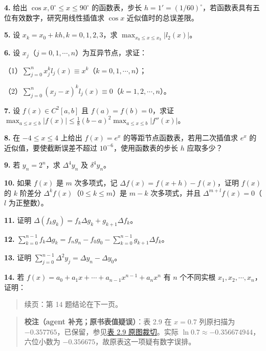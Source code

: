 \documentclass[
  10pt,
  fontset=fandol]{ctexart}
\begin{document}
\textbf{4.} 给出 \(\cos x,0^\circ\leqslant x\leqslant90^\circ\) 的函数表，步长 \(h=1'=(1/60)^\circ\)，若函数表具有五位有效数字，研究用线性插值求 \(\cos x\) 近似值时的总误差限。

\textbf{5.} 设 \(x_k=x_0+kh,k=0,1,2,3\)，求 \(\max_{x_0\leqslant x\leqslant x_3}|l_2(x)|\)。

\textbf{6.} 设 \(x_j\)（\(j=0,1,\cdots,n\)）为互异节点，求证：

（1）\(\displaystyle\sum_{j=0}^n x_j^kl_j(x)\equiv x^k\)（\(k=0,1,\cdots,n\)）；

（2）\(\displaystyle\sum_{j=0}^n(x_j-x)^kl_j(x)\equiv0\)（\(k=1,2,\cdots,n\)）。

\textbf{7.} 设 \(f(x)\in C^2[a,b]\) 且 \(f(a)=f(b)=0\)，求证 \(\displaystyle\max_{a\leqslant x\leqslant b}|f(x)|\leqslant\frac18(b-a)^2\max_{a\leqslant x\leqslant b}|f''(x)|\)。

\textbf{8.} 在 \(-4\leqslant x\leqslant4\) 上给出 \(f(x)=e^x\) 的等距节点函数表，若用二次插值求 \(e^x\) 的近似值，要使截断误差不超过 \(10^{-6}\)，使用函数表的步长 \(h\) 应取多少？

\textbf{9.} 若 \(y_n=2^n\)，求 \(\Delta^4y_n\) 及 \(\delta^4y_n\)。

\textbf{10.} 如果 \(f(x)\) 是 \(m\) 次多项式，记 \(\Delta f(x)=f(x+h)-f(x)\)，证明 \(f(x)\) 的 \(k\) 阶差分 \(\Delta^kf(x)\)（\(0\leqslant k\leqslant m\)）是 \(m-k\) 次多项式，并且 \(\Delta^{m+l}f(x)=0\)（\(l\) 为正整数）。

\textbf{11.} 证明 \(\Delta(f_kg_k)=f_k\Delta g_k+g_{k+1}\Delta f_k\)。

\textbf{12.} \(\displaystyle\sum_{k=0}^{n-1}f_k\Delta g_k=f_ng_n-f_0g_0-\sum_{k=0}^{n-1}g_{k+1}\Delta f_k\)。

\textbf{13.} 证明 \(\displaystyle\sum_{j=0}^{n-1}\Delta^2y_j=\Delta y_n-\Delta y_0\)。

\textbf{14.} 若 \(f(x)=a_0+a_1x+\cdots+a_{n-1}x^{n-1}+a_nx^n\) 有 \(n\) 个不同实根 \(x_1,x_2,\cdots,x_n\)，证明：

\begin{quote}
续页：第 14 题结论在下一页。
\end{quote}

\begin{quote}
\textbf{校注（agent 补充；原书表值疑误）}：表 2.9 在 \(x=0.7\) 列原扫描为 \(-0.357765\)，已保留，参见\href{../assets/ch02b/table-2-9.png}{表 2.9 原图裁切}。实际 \(\ln0.7\approx-0.356674944\)，六位小数为 \(-0.356675\)，故原表这一项疑有数字误排。
\end{quote}
\end{document}
